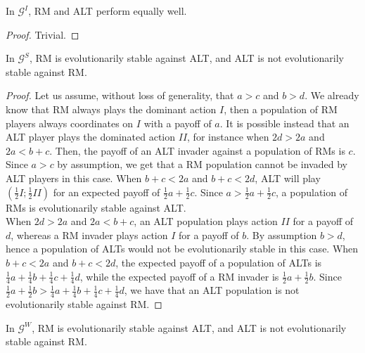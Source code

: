 \documentclass[fleqn,reqno,11pt]{article}
\begin{document}
\begin{lemma}
In $\mathcal{G}^I$, RM and ALT perform equally well.
\end{lemma}

\begin{proof}
Trivial.
\end{proof}

\begin{lemma}
In $\mathcal{G}^S$, RM is evolutionarily stable against ALT, and ALT is not evolutionarily stable against RM. 
\end{lemma}

\begin{proof}
Let us assume, without loss of generality, that $a>c$ and $b>d$. We already know that RM always plays the dominant action $I$, then a population of RM players always coordinates on $I$ with a payoff of $a$. It is possible instead that an ALT player plays the dominated action $II$, for instance when $2d > 2a$ and $2a < b+c$. Then, the payoff of an ALT invader against a population of RMs is $c$. Since $a>c$ by assumption, we get that a RM population cannot be invaded by ALT players in this case. When $b+c < 2a$ and $b+c < 2d$, ALT will play $(\frac{1}{2}I;\frac{1}{2}II)$ for an expected payoff of $\frac{1}{2} a + \frac{1}{2} c$. Since $a > \frac{1}{2} a + \frac{1}{2} c$, a population of RMs is evolutionarily stable against ALT. \\
When $2d > 2a$ and $2a < b+c$, an ALT population plays action $II$ for a payoff of $d$, whereas a RM invader plays action $I$ for a payoff of $b$. By assumption $b>d$, hence a population of ALTs would not be evolutionarily stable in this case. When $b+c < 2a$ and $b+c < 2d$, the expected payoff of a population of ALTs is $\frac{1}{4}a+\frac{1}{4}b+\frac{1}{4}c+\frac{1}{4}d$, while the expected payoff of a RM invader is $\frac{1}{2}a+\frac{1}{2}b$. Since $\frac{1}{2}a+\frac{1}{2}b > \frac{1}{4}a+\frac{1}{4}b+\frac{1}{4}c+\frac{1}{4}d$, we have that an ALT population is not evolutionarily stable against RM.
\end{proof}



\begin{lemma}
In $\mathcal{G}^W$, RM is evolutionarily stable against ALT, and ALT is not evolutionarily stable against RM. 
\end{lemma}
\end{document}
